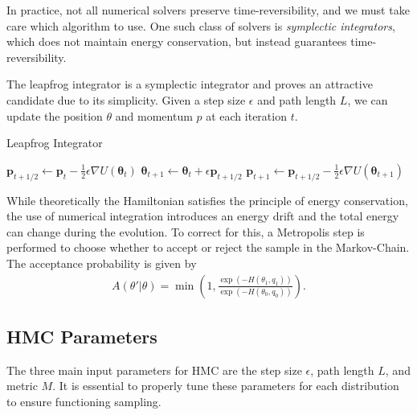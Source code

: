 \documentclass[11pt]{article}
\begin{document}
    In practice, not all numerical solvers preserve time-reversibility, and we must take care which algorithm to use.
    One such class of solvers is \emph{symplectic integrators}, which does not
    maintain energy conservation, but instead guarantees time-reversibility.

    The leapfrog integrator is a symplectic integrator and proves an attractive candidate due to its simplicity.
    Given a step size $\epsilon$ and path length $L$, we can update the position $\theta$ and momentum $p$ at each iteration $t$.
    \begin{algorithm}
    \caption{Leapfrog Integrator}
    \label{alg:leapfrog_integrator}
    \begin{algorithmic}
        \STATE {}
        \STATE $\mathbf{p}_{t+1/2} \gets \mathbf{p}_t - \frac{1}{2} \epsilon \nabla U(\mathbf{\theta}_t)$
        \STATE
        \STATE $ \mathbf{\theta}_{t+1} \gets \mathbf{\theta}_t + \epsilon \mathbf{p}_{t+1/2}$
        \STATE
        \STATE $ \mathbf{p}_{t+1} \gets \mathbf{p}_{t+1/2} - \frac{1}{2} \epsilon \nabla U(\mathbf{\theta}_{t+1})$
        \ENDFOR
    \end{algorithmic}
    \end{algorithm}

    While theoretically the Hamiltonian satisfies the principle of energy conservation, the use of numerical
    integration introduces an energy drift and the total energy can change during the evolution.
    To correct for this, a Metropolis step is performed to choose whether to accept or reject the sample in
    the Markov-Chain.
    The acceptance probability is given by
    \begin{equation}\label{eq:hmc_accept_prob}
    \begin{aligned}
        A(\theta' | \theta) = \min \left(1, \frac{\exp(-H(\theta_1, q_1)) }{\exp(-H(\theta_0, q_0)) } \right).
    \end{aligned}
    \end{equation}

\subsection{HMC Parameters}\label{subsec:hmc_params}
    The three main input parameters for HMC are the step size $\epsilon$, path length $L$, and metric $M$.
    It is essential to properly tune these parameters for each distribution to ensure functioning sampling.
\end{document}
